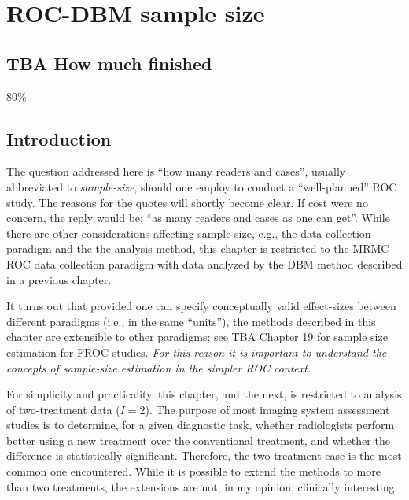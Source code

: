 \documentclass[
]{book}
\begin{document}
\hypertarget{roc-sample-size-dbm}{%
\chapter{ROC-DBM sample size}\label{roc-sample-size-dbm}}

\hypertarget{roc-sample-size-dbm-how-much-finished}{%
\section{TBA How much finished}\label{roc-sample-size-dbm-how-much-finished}}

80\%

\hypertarget{roc-sample-size-dbm-introduction}{%
\section{Introduction}\label{roc-sample-size-dbm-introduction}}

The question addressed here is ``how many readers and cases'', usually abbreviated to \emph{sample-size}, should one employ to conduct a ``well-planned'' ROC study. The reasons for the quotes will shortly become clear. If cost were no concern, the reply would be: ``as many readers and cases as one can get''. While there are other considerations affecting sample-size, e.g., the data collection paradigm and the the analysis method, this chapter is restricted to the MRMC ROC data collection paradigm with data analyzed by the DBM method described in a previous chapter.

It turns out that provided one can specify conceptually valid effect-sizes between different paradigms (i.e., in the same ``units''), the methods described in this chapter are extensible to other paradigms; see TBA Chapter 19 for sample size estimation for FROC studies. \emph{For this reason it is important to understand the concepts of sample-size estimation in the simpler ROC context.}

For simplicity and practicality, this chapter, and the next, is restricted to analysis of two-treatment data (\(I = 2\)). The purpose of most imaging system assessment studies is to determine, for a given diagnostic task, whether radiologists perform better using a new treatment over the conventional treatment, and whether the difference is statistically significant. Therefore, the two-treatment case is the most common one encountered. While it is possible to extend the methods to more than two treatments, the extensions are not, in my opinion, clinically interesting.
\end{document}
